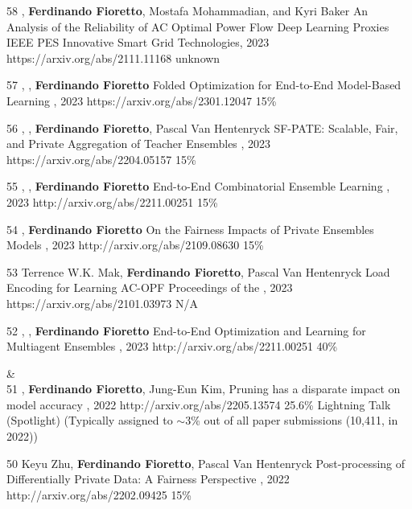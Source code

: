 \begin{pubs}
\confentry
	{58}
	{, {\bf Ferdinando Fioretto}, Mostafa Mohammadian, and Kyri Baker}
	{An Analysis of the Reliability of AC Optimal Power Flow Deep Learning Proxies}
	{IEEE PES Innovative Smart Grid Technologies, 2023}
	{https://arxiv.org/abs/2111.11168}
	{unknown}

\confentry 
	{57} %
	{, , {\bf Ferdinando Fioretto}}
	{Folded Optimization for End-to-End Model-Based Learning}
	{\procIJCAI, 2023}
	{https://arxiv.org/abs/2301.12047}
	{15\%}

\confentry
    {56} %
	{, , {\bf Ferdinando Fioretto}, Pascal Van Hentenryck}
	{SF-PATE: Scalable, Fair, and Private Aggregation of Teacher Ensembles}
    {\procIJCAI, 2023}
	{https://arxiv.org/abs/2204.05157}
    {15\%}

\confentry
    {55} %
	{, , {\bf Ferdinando Fioretto}}
	{End-to-End Combinatorial Ensemble Learning}
    {\procIJCAI, 2023}
	{http://arxiv.org/abs/2211.00251}
    {15\%}

\confentry
    {54} %
	{, {\bf Ferdinando Fioretto}}
	{On the Fairness Impacts of Private Ensembles Models}
    {\procIJCAI, 2023}
	{http://arxiv.org/abs/2109.08630}
    {15\%}

\confentry
	{53} %
	{Terrence W.K. Mak, {\bf Ferdinando Fioretto}, Pascal Van Hentenryck}
	{Load Encoding for Learning AC-OPF}
	{Proceedings of the , 2023}
	{https://arxiv.org/abs/2101.03973}
	{N/A}

\confentry
    {52} %
	{, , {\bf Ferdinando Fioretto}}
	{End-to-End Optimization and Learning for Multiagent Ensembles}
    {\procAAMAS, 2023}
	{http://arxiv.org/abs/2211.00251}
    {40\%}

{}&\nemph{\rule{0.5\linewidth}{0.5pt}}\\[1em]

\confentryAwd
	{51} %
	{, {\bf Ferdinando Fioretto}, Jung-Eun Kim, }
	{Pruning has a disparate impact on model accuracy}
	{\procNeurIPS, 2022}
	{http://arxiv.org/abs/2205.13574}
	{25.6\%}
	{Lightning Talk (Spotlight)}
	{(Typically assigned to $\sim$3\% out of all paper submissions (10,411, in 2022))}

	\confentry
	{50} %
	{Keyu Zhu, {\bf Ferdinando Fioretto}, Pascal Van Hentenryck}
	{Post-processing of Differentially Private Data: A Fairness Perspective}
	{\procIJCAI, 2022}
	{http://arxiv.org/abs/2202.09425}	
	{15\%}


\end{pubs}
